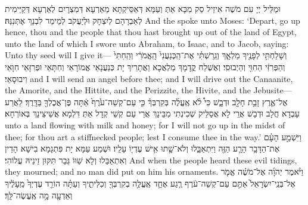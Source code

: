 {וּמַלֵּיל יְיָ עִם מֹשֶׁה אִיזֵיל סַק מִכָּא אַתְּ וְעַמָּא דְּאַסֵּיקְתָּא מֵאַרְעָא דְּמִצְרָיִם לְאַרְעָא דְּקַיֵּימִית לְאַבְרָהָם לְיִצְחָק וּלְיַעֲקֹב לְמֵימַר לִבְנָךְ אֶתְּנִנַּהּ׃}
{And the \lord\space spoke unto Moses: ‘Depart, go up hence, thou and the people that thou hast brought up out of the land of Egypt, unto the land of which I swore unto Abraham, to Isaac, and to Jacob, saying: Unto thy seed will I give it—}{}
{וְשָׁלַחְתִּ֥י לְפָנֶ֖יךָ מַלְאָ֑ךְ וְגֵֽרַשְׁתִּ֗י אֶת־הַֽכְּנַעֲנִי֙ הָֽאֱמֹרִ֔י וְהַֽחִתִּי֙ וְהַפְּרִזִּ֔י הַחִוִּ֖י וְהַיְבוּסִֽי׃
}
{וְאֶשְׁלַח קֳדָמָךְ מַלְאֲכָא וַאֲתָרֵיךְ יָת כְּנַעֲנָאֵי אֱמוֹרָאֵי וְחִתָּאֵי וּפְרִזָּאֵי חִוָּאֵי וִיבוּסָאֵי׃}
{and I will send an angel before thee; and I will drive out the Canaanite, the Amorite, and the Hittite, and the Perizzite, the Hivite, and the Jebusite—}{}
{אֶל־אֶ֛רֶץ זָבַ֥ת חָלָ֖ב וּדְבָ֑שׁ כִּי֩ לֹ֨א אֶֽעֱלֶ֜ה בְּקִרְבְּךָ֗ כִּ֤י עַם־קְשֵׁה־עֹ֙רֶף֙ אַ֔תָּה פֶּן־אֲכֶלְךָ֖ בַּדָּֽרֶךְ׃
}
{לַאֲרַע עָבְדָא חֲלָב וּדְבָשׁ אֲרֵי לָא אֲסַלֵּיק שְׁכִינְתִי מִבֵּינָךְ אֲרֵי עַם קְשֵׁי קְדָל אַתְּ דִּלְמָא אֲשֵׁיצֵינָךְ בְּאוֹרְחָא׃}
{unto a land flowing with milk and honey; for I will not go up in the midst of thee; for thou art a stiffnecked people; lest I consume thee in the way.’}{}
{וַיִּשְׁמַ֣ע הָעָ֗ם אֶת־הַדָּבָ֥ר הָרָ֛ע הַזֶּ֖ה וַיִּתְאַבָּ֑לוּ וְלֹא־שָׁ֛תוּ אִ֥ישׁ עֶדְי֖וֹ עָלָֽיו׃
}
{וּשְׁמַע עַמָּא יָת פִּתְגָמָא בִישָׁא הָדֵין וְאִתְאַבַּלוּ וְלָא שַׁוּוֹ גְּבַר תִּקּוּן זֵינֵיהּ עֲלוֹהִי׃}
{And when the people heard these evil tidings, they mourned; and no man did put on him his ornaments.}{}
{וַיֹּ֨אמֶר יְהֹוָ֜ה אֶל־מֹשֶׁ֗ה אֱמֹ֤ר אֶל־בְּנֵֽי־יִשְׂרָאֵל֙ אַתֶּ֣ם עַם־קְשֵׁה־עֹ֔רֶף רֶ֧גַע אֶחָ֛ד אֶֽעֱלֶ֥ה בְקִרְבְּךָ֖ וְכִלִּיתִ֑יךָ וְעַתָּ֗ה הוֹרֵ֤ד עֶדְיְךָ֙ מֵֽעָלֶ֔יךָ וְאֵדְעָ֖ה מָ֥ה אֶֽעֱשֶׂה־לָּֽךְ׃
}
